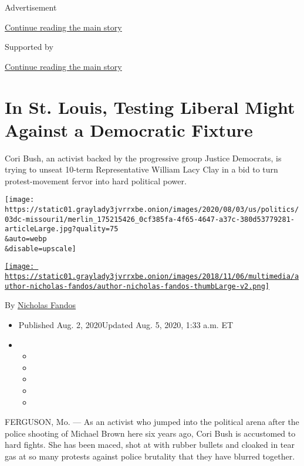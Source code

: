 Advertisement

\protect\hyperlink{after-top}{Continue reading the main story}

Supported by

\protect\hyperlink{after-sponsor}{Continue reading the main story}

\hypertarget{in-st-louis-testing-liberal-might-against-a-democratic-fixture}{%
\section{In St. Louis, Testing Liberal Might Against a Democratic
Fixture}\label{in-st-louis-testing-liberal-might-against-a-democratic-fixture}}

Cori Bush, an activist backed by the progressive group Justice
Democrats, is trying to unseat 10-term Representative William Lacy Clay
in a bid to turn protest-movement fervor into hard political power.

\texttt{[image: https://static01.graylady3jvrrxbe.onion/images/2020/08/03/us/politics/03dc-missouri1/merlin\_175215426\_0cf385fa-4f65-4647-a37c-380d53779281-articleLarge.jpg?quality=75\\\&auto=webp\\\&disable=upscale]}

\href{https://www.nytimes3xbfgragh.onion/by/nicholas-fandos}{\texttt{[image: https://static01.graylady3jvrrxbe.onion/images/2018/11/06/multimedia/author-nicholas-fandos/author-nicholas-fandos-thumbLarge-v2.png]}}

By \href{https://www.nytimes3xbfgragh.onion/by/nicholas-fandos}{Nicholas
Fandos}

\begin{itemize}
\item
  Published Aug. 2, 2020Updated Aug. 5, 2020, 1:33 a.m. ET
\item
  \begin{itemize}
  \item
  \item
  \item
  \item
  \item
  \end{itemize}
\end{itemize}

FERGUSON, Mo. --- As an activist who jumped into the political arena
after the police shooting of Michael Brown here six years ago, Cori Bush
is accustomed to hard fights. She has been maced, shot at with rubber
bullets and cloaked in tear gas at so many protests against police
brutality that they have blurred together.


